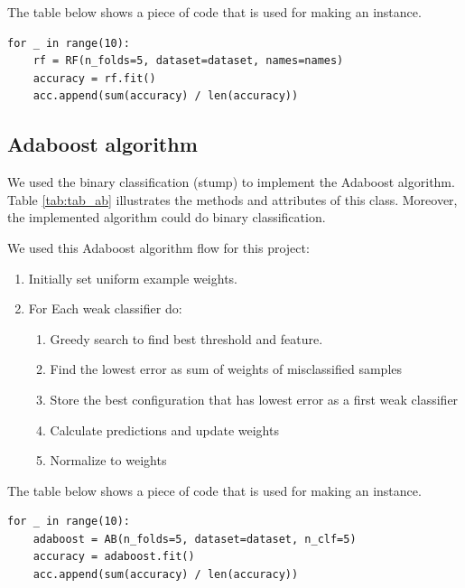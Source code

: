 The table below shows a piece of code that is used for making an instance. 

\begin{table}[H]
\centering
\caption{Making an instance of Random Forests class.}
\begin{lstlisting}
for _ in range(10):
    rf = RF(n_folds=5, dataset=dataset, names=names)
    accuracy = rf.fit()
    acc.append(sum(accuracy) / len(accuracy))
\end{lstlisting}
\end{table}






\subsection{Adaboost algorithm}
We used the binary classification (stump) to implement the Adaboost algorithm. Table \ref{tab:tab_ab} illustrates the methods and attributes of this class. Moreover, the implemented algorithm could do binary classification.

\begin{table}[H]
\centering
\caption{The methods and attributes of Adaboost class.}
\label{tab:tab_ab}

\end{table}
We used this Adaboost algorithm flow for this project:
\begin{enumerate}
    \item Initially set uniform example weights.
    \item For Each weak classifier do:
    \begin{enumerate}
        \item Greedy search to find best threshold and feature.
        \item Find the lowest error as sum of weights of misclassified samples 
        \item Store the best configuration that has lowest error as a first weak classifier
        \item Calculate predictions and update weights
        \item Normalize to weights
    \end{enumerate}

\end{enumerate}

The table below shows a piece of code that is used for making an instance. 

\begin{table}[H]
\centering
\caption{Making an instance of Adaboost class.}
\begin{lstlisting}
for _ in range(10):
    adaboost = AB(n_folds=5, dataset=dataset, n_clf=5)
    accuracy = adaboost.fit()
    acc.append(sum(accuracy) / len(accuracy))
\end{lstlisting}
\end{table}